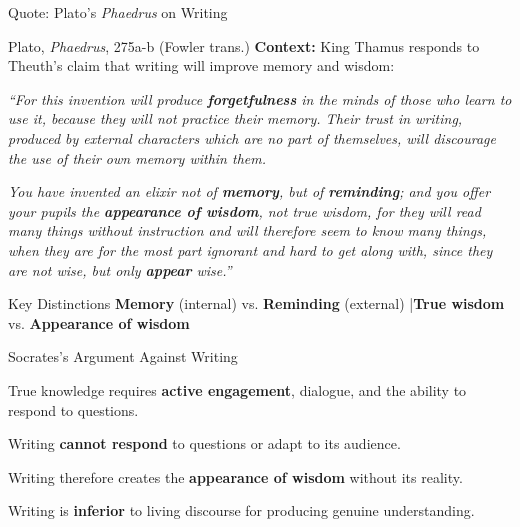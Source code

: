 \documentclass[aspectratio=169,11pt]{beamer}
\begin{document}
\begin{frame}{Quote: Plato's \textit{Phaedrus} on Writing}
\begin{exampleblock}{\faQuoteLeft\hspace{0.5em}Plato, \textit{Phaedrus}, 275a-b (Fowler trans.)}
\small
\textbf{Context:} King Thamus responds to Theuth's claim that writing will improve memory and wisdom:

\vspace{0.5em}
\textit{``For this invention will produce \textbf{forgetfulness} in the minds of those who learn to use it, because they will not practice their memory. Their trust in writing, produced by external characters which are no part of themselves, will discourage the use of their own memory within them.}

\vspace{0.3em}
\textit{You have invented an elixir not of \textbf{memory}, but of \textbf{reminding}; and you offer your pupils the \textbf{appearance of wisdom}, not true wisdom, for they will read many things without instruction and will therefore seem to know many things, when they are for the most part ignorant and hard to get along with, since they are not wise, but only \textbf{appear} wise.''}
\end{exampleblock}

\vspace{0.3em}
\begin{block}{\faLightbulb\hspace{0.5em}Key Distinctions}
\textbf{Memory} (internal) vs. \textbf{Reminding} (external) \quad|\quad \textbf{True wisdom} vs. \textbf{Appearance of wisdom}
\end{block}
\end{frame}

\begin{frame}{Socrates's Argument Against Writing}
\begin{argument}
  \item True knowledge requires \textbf{active engagement}, dialogue, and the ability to respond to questions.
  \item Writing \textbf{cannot respond} to questions or adapt to its audience.
  \item Writing therefore creates the \textbf{appearance of wisdom} without its reality.
  \item[\textbf{$\therefore$}] Writing is \textbf{inferior} to living discourse for producing genuine understanding.
\end{argument}

\vspace{0.5em}
\end{frame}
\end{document}
